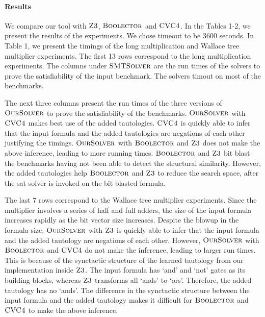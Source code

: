 \paragraph{\bf Results}
%
We compare our tool with $\textsc{Z3}$, $\textsc{Boolector}$ and $\textsc{CVC4}$.
%
In the Tables 1-2, we present the results of the experiments.
%
We chose timeout to be 3600 seconds.
%
In Table 1, we present the timings of the long multiplication and
Wallace tree multiplier experiments.
%
The first 13 rows correspond to
the long multiplication experiments.
%
The columns under $\textsc{SMTSolver}$ are the run times of the
solvers to prove the satisfiability of the input benchmark.
%
The solvers timout on most of the benchmarks.
%



The next three columns present the run times of the three versions of
$\textsc{OurSolver}$ to prove the satisfiability of the benchmarks.
%
$\textsc{OurSolver}$ with $\textsc{CVC4}$ makes best use of the added tautologies.
%
$\textsc{CVC4}$ is quickly able to infer that the input formula and the
added tautologies are negations of each other justifying the timings.
%
$\textsc{OurSolver}$ with $\textsc{Boolector}$ and $\textsc{Z3}$ does not make the above
inference, leading to more running times.
%
$\textsc{Boolector}$ and $\textsc{Z3}$ bit blast the benchmarks having not been
able to detect the structural similarity.
%
However, the added tautologies help $\textsc{Boolector}$ and $\textsc{Z3}$ to
reduce the search space, after the sat solver is invoked on the bit
blasted formula.


The last 7 rows correspond to the Wallace tree multiplier experiments.
%
Since the multiplier involves a series of half and full adders, the
size of the input formula increases rapidly as the bit vector size
increases.
%
Despite the blowup in the formula size, $\textsc{OurSolver}$ with $\textsc{Z3}$ is
quickly able to infer that the input formula and the added tautology
are negations of each other.
%
However, $\textsc{OurSolver}$ with $\textsc{Boolector}$ and $\textsc{CVC4}$ do not make the
inference, leading to larger run times.
%
This is because of the synctactic structure of the learned tautology
from our implementation inside $\textsc{Z3}$.
%
The input formula has `and' and `not' gates as its building blocks,
whereas $\textsc{Z3}$ transforms all `ands' to `ors'.
%
Therefore, the added tautology has no `ands'.
%
The difference in the synctactic structure between the input formula
and the added tautology makes it difficult for $\textsc{Boolector}$ and
$\textsc{CVC4}$ to make the above inference.
%

